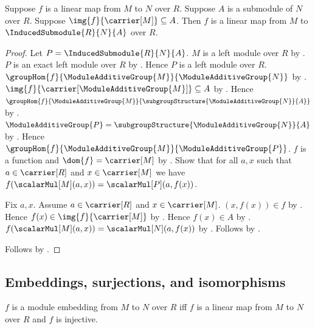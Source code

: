 \begin{theorem}\label{linear_map_codomain_corestriction}
    Suppose $f$ is a linear map from $M$ to $N$ over $R$.
    Suppose $A$ is a submodule of $N$ over $R$.
    Suppose $\img{f}{\carrier[M]}\subseteq A$.
    Then $f$ is a linear map from $M$ to
        $\InducedSubmodule{R}{N}{A}$ over $R$.
\end{theorem}
\begin{proof}
    Let $P=\InducedSubmodule{R}{N}{A}$.
    $M$ is a left module over $R$ by
        .
    $P$ is an exact left module over $R$ by
        .
    Hence $P$ is a left module over $R$.
    $\groupHom{f}{\ModuleAdditiveGroup{M}}{
        \ModuleAdditiveGroup{N}}$ by
        .
    $\img{f}{\carrier[\ModuleAdditiveGroup{M}]}\subseteq A$ by
        .
    Hence $\groupHom{f}{\ModuleAdditiveGroup{M}}{
        \subgroupStructure{\ModuleAdditiveGroup{N}}{A}}$ by
        .
    $\ModuleAdditiveGroup{P}
        =\subgroupStructure{\ModuleAdditiveGroup{N}}{A}$ by
        .
    Hence $\groupHom{f}{\ModuleAdditiveGroup{M}}{
        \ModuleAdditiveGroup{P}}$.
    $f$ is a function and $\dom{f}=\carrier[M]$ by
        .
    Show that for all $a,x$ such that $a\in\carrier[R]$ and
        $x\in\carrier[M]$ we have
        $f(\scalarMul[M](a,x))=\scalarMul[P](a,f(x))$.
    \begin{subproof}
        Fix $a,x$.
        Assume $a\in\carrier[R]$ and $x\in\carrier[M]$.
        $(x,f(x))\in f$ by .
        Hence $f(x)\in\img{f}{\carrier[M]}$ by .
        Hence $f(x)\in A$ by .
        $f(\scalarMul[M](a,x))=\scalarMul[N](a,f(x))$ by
            .
        Follows by .
    \end{subproof}
    Follows by .
\end{proof}

\subsection{Embeddings, surjections, and isomorphisms}

\begin{definition}\label{module_embedding}
    $f$ is a module embedding from $M$ to $N$ over $R$ iff
        $f$ is a linear map from $M$ to $N$ over $R$ and
        $f$ is injective.
\end{definition}


